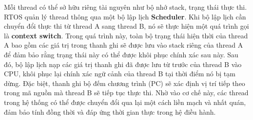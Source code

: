 Mỗi thread có thể sở hữu riêng tài nguyên như bộ nhớ stack, trạng thái thực thi. 
RTOS quản lý thread thông qua một bộ lập lịch \textbf{Scheduler}. 
Khi bộ lập lịch cần chuyển đổi thực thi từ thread A sang thread B, nó sẽ thực hiện một quá trình gọi là \textbf{context switch}. 
Trong quá trình này, toàn bộ trạng thái hiện thời của thread A bao gồm các giá trị trong thanh ghi sẽ được lưu vào stack riêng của thread A để đảm bảo rằng trạng thái này có thể được khôi phục chính xác sau này. 
Sau đó, bộ lập lịch nạp các giá trị thanh ghi đã được lưu từ trước của thread B vào CPU, khôi phục lại chính xác ngữ cảnh của thread B tại thời điểm nó bị tạm dừng. 
Đặc biệt, thanh ghi bộ đếm chương trình (PC) sẽ xác định vị trí tiếp theo trong mã nguồn mà thread B sẽ tiếp tục thực thi. 
Nhờ vào cơ chế này, các thread trong hệ thống có thể được chuyển đổi qua lại một cách liền mạch và nhất quán, đảm bảo tính đồng thời và đáp ứng thời gian thực trong hệ điều hành. 


    
    


